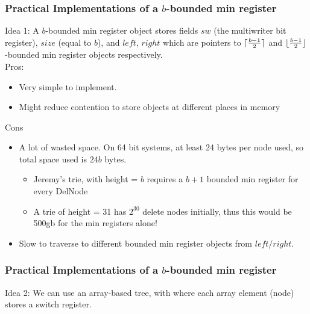 \documentclass{beamer}
\DeclarePairedDelimiter\ceil{\lceil}{\rceil}
\DeclarePairedDelimiter\floor{\lfloor}{\rfloor}
\begin{document}
\begin{frame}
\frametitle{Practical Implementations of a $b$-bounded min register}
Idea 1: A $b$-bounded min register object stores fields $sw$ (the multiwriter bit register), $size$ (equal to $b$), 
and $left$, $right$ which are pointers to $\ceil{\frac{b-1}{2}}$ and $\floor{\frac{b-1}{2}}$-bounded min register objects respectively.
\\
Pros:
\begin{itemize}
	\item Very simple to implement.
	\item Might reduce contention to store objects at different places in memory
\end{itemize}
Cons
\begin{itemize}
	\item A lot of wasted space. On 64 bit systems, at least 24 bytes per node used, so total space used is $24b$ bytes.
	\begin{itemize}
		\item Jeremy's trie, with height = $b$ requires a $b+1$ bounded min register for every DelNode
		\item A trie of height = 31 has $2^{30}$ delete nodes initially, thus this would be 500gb for the min registers alone!
	\end{itemize}
	\item Slow to traverse to different bounded min register objects from $left/right$.
\end{itemize}
\end{frame}
\begin{frame}
\frametitle{Practical Implementations of a $b$-bounded min register}
Idea 2: We can use an array-based tree, with where each array element (node) stores a switch register.
\end{frame}
\end{document}
